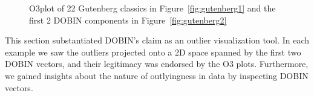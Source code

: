 \documentclass[11pt]{article}
\begin{document}
\begin{figure}[!ht]
	\centering
	\caption{O3plot of 22 Gutenberg classics in Figure~\ref{fig:gutenberg1} and the first 2 DOBIN components in Figure~\ref{fig:gutenberg2} }
	\label{fig:gutenberg}
\end{figure}

This section substantiated DOBIN's claim as an outlier visualization tool. In each example we saw the outliers projected onto a 2D space spanned by the first two DOBIN vectors, and their legitimacy was endorsed by the O3 plots. Furthermore, we gained insights about the nature of  outlyingness in data by inspecting  DOBIN vectors. \\
\end{document}
